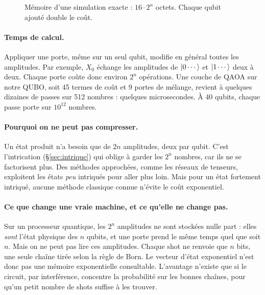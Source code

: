 \begin{figure}[htbp]
\centering
{}
\caption{Mémoire d'une simulation exacte : $16\cdot2^n$ octets. Chaque qubit ajouté double le coût.}\label{fig:memoire}
\end{figure}

\paragraph{Temps de calcul.} Appliquer une porte, même sur un seul qubit, modifie en général toutes les amplitudes. Par exemple, $X_0$ échange les amplitudes de $\lvert 0\cdots\rangle$ et $\lvert 1\cdots\rangle$ deux à deux. Chaque porte coûte donc environ $2^n$ opérations. Une couche de QAOA sur notre QUBO, soit 45 termes de coût et 9 portes de mélange, revient à quelques dizaines de passes sur 512 nombres : quelques microsecondes. À 40 qubits, chaque passe porte sur $10^{12}$ nombres.

\paragraph{Pourquoi on ne peut pas compresser.} Un état produit n'a besoin que de $2n$ amplitudes, deux par qubit. C'est l'intrication (§\ref{sec:intrique}) qui oblige à garder les $2^n$ nombres, car ils ne se factorisent plus. Des méthodes approchées, comme les réseaux de tenseurs, exploitent les états \emph{peu} intriqués pour aller plus loin. Mais pour un état fortement intriqué, aucune méthode classique connue n'évite le coût exponentiel.

\paragraph{Ce que change une vraie machine, et ce qu'elle ne change pas.} Sur un processeur quantique, les $2^n$ amplitudes ne sont stockées nulle part : elles \emph{sont} l'état physique des $n$ qubits, et une porte prend le même temps quel que soit $n$. Mais on ne peut pas lire ces amplitudes. Chaque shot ne renvoie que $n$ bits, une seule chaîne tirée selon la règle de Born. Le vecteur d'état exponentiel n'est donc pas une mémoire exponentielle consultable. L'avantage n'existe que si le circuit, par interférence, concentre la probabilité sur les bonnes chaînes, pour qu'un petit nombre de shots suffise à les trouver.

